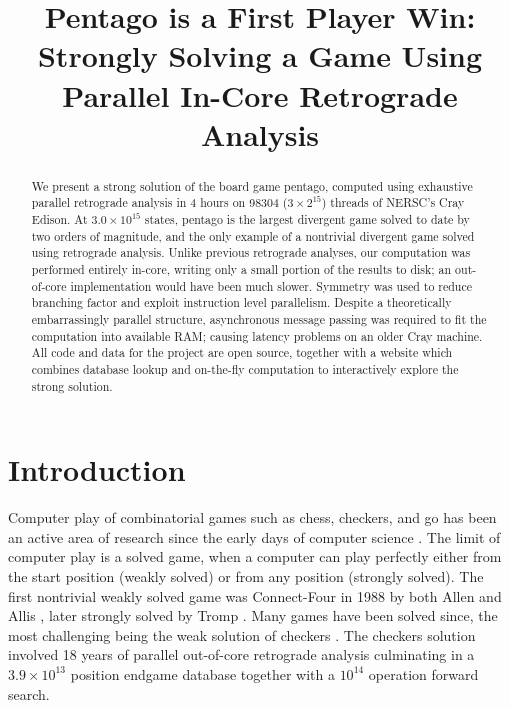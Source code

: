 \documentclass[conference]{IEEEtran}
\begin{document}
\title{Pentago is a First Player Win: Strongly Solving a Game Using Parallel In-Core Retrograde Analysis}
\author{}

\maketitle

\begin{abstract}
\boldmath
We present a strong solution of the board game pentago, computed using exhaustive parallel
retrograde analysis in 4 hours on 98304 ($3 \times 2^{15}$) threads of NERSC's Cray Edison.
At $3.0 \times 10^{15}$ states, pentago is the largest divergent game solved to date by
two orders of magnitude, and the only example of a nontrivial divergent game solved
using retrograde analysis.
Unlike previous retrograde analyses, our computation was performed entirely in-core,
writing only a small portion of the results to disk; an out-of-core implementation would
have been much slower.  Symmetry was used to reduce branching factor
and exploit instruction level parallelism.  Despite a theoretically
embarrassingly parallel structure, asynchronous message passing was required to fit the
computation into available RAM; causing latency problems
on an older Cray machine.  All code and data for the project are
open source, together with a website which combines database lookup and on-the-fly computation
to interactively explore the strong solution.
\end{abstract}

\IEEEpeerreviewmaketitle

\vspace{-.02in}
\section{Introduction}

Computer play of combinatorial games such as chess, checkers, and go has been an active area of research
since the early days of computer science \cite{shannon1950chess}.  The limit of computer play is a solved
game, when a computer can play perfectly either from the start position (weakly solved) or from any
position (strongly solved).  The first nontrivial weakly solved game was Connect-Four in 1988 by both
Allen and Allis \cite{allis1988connectfour}, later strongly solved by Tromp \cite{tromp1995}.  Many games
have been solved since, the most challenging being the weak solution of checkers \cite{schaeffer2007checkers}.
The checkers solution involved 18 years of parallel out-of-core retrograde analysis culminating in a
$3.9 \times 10^{13}$ position endgame database together with a $10^{14}$ operation forward search.
\end{document}
